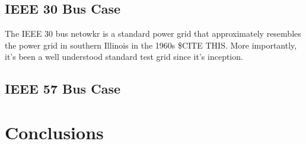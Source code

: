 \documentclass[10pt]{article}
\begin{document}
\subsection{IEEE 30 Bus Case}

The IEEE 30 bus netowkr is a standard power grid that approximately resembles the power grid in southern Illinois in the 1960s \$CITE THIS. More importantly, it's been a well understood standard test grid since it's inception.
\subsection{IEEE 57 Bus Case}

\section{\large{Conclusions}}
\label{sec:issues}
\vspace*{-12pt}



\end{document}
